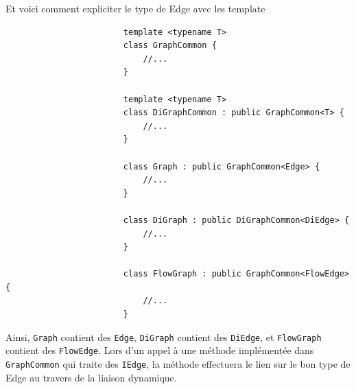 \documentclass[french]{article}
\begin{document}
			Et voici comment expliciter le type de Edge avec les template
			\begin{lstlisting}
						template <typename T>
						class GraphCommon {
							//...
						}
						
						template <typename T>
						class DiGraphCommon : public GraphCommon<T> {
							//...
						}
						
						class Graph : public GraphCommon<Edge> {
							//...
						}
						
						class DiGraph : public DiGraphCommon<DiEdge> {
							//...
						}
						
						class FlowGraph : public GraphCommon<FlowEdge> {
							//...
						}
			\end{lstlisting}
			Ainsi, \lstinline[basicstyle=\ttfamily\color{blue}]|Graph| contient des \lstinline[basicstyle=\ttfamily\color{blue}]|Edge|, \lstinline[basicstyle=\ttfamily\color{blue}]|DiGraph| contient des \lstinline[basicstyle=\ttfamily\color{blue}]|DiEdge|, et \lstinline[basicstyle=\ttfamily\color{blue}]|FlowGraph| contient des \lstinline[basicstyle=\ttfamily\color{blue}]|FlowEdge|. Lors d'un appel à une méthode implémentée dans \lstinline[basicstyle=\ttfamily\color{blue}]|GraphCommon| qui traite des \lstinline[basicstyle=\ttfamily\color{blue}]|IEdge|, la méthode effectuera le lien sur le bon type de Edge au travers de la liaison dynamique.
		
\end{document}
